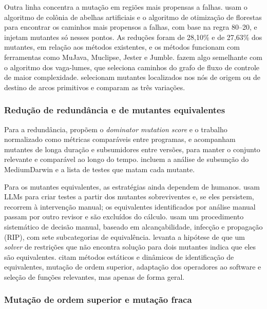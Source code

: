 Outra linha concentra a mutação em regiões mais propensas a falhas.  usam o algoritmo de colônia de abelhas artificiais e  o algoritmo de otimização de florestas para encontrar os caminhos mais propensos a falhas, com base na regra 80--20, e injetam mutantes só nesses pontos. As reduções foram de 28,10\% e de 27,63\% dos mutantes, em relação aos métodos existentes, e os métodos funcionam com ferramentas como MuJava, Muclipse, Jester e Jumble.  fazem algo semelhante com o algoritmo dos vaga-lumes, que seleciona caminhos do grafo de fluxo de controle de maior complexidade.  selecionam mutantes localizados nos nós de origem ou de destino de arcos primitivos e comparam as três variações.

\subsubsection{Redução de redundância e de mutantes equivalentes}
\label{subsubsec:reducao-redundancia}

Para a redundância,  propõem o \textit{dominator mutation score} e o trabalho normalizado como métricas comparáveis entre programas, e  acompanham mutantes de longa duração e subsumidores entre versões, para manter o conjunto relevante e comparável ao longo do tempo.  incluem a análise de subsunção do MediumDarwin e a lista de testes que matam cada mutante.

Para os mutantes equivalentes, as estratégias ainda dependem de humanos.  usam LLMs para criar testes a partir dos mutantes sobreviventes e, se eles persistem, recorrem à intervenção manual; os equivalentes identificados por análise manual passam por outro revisor e são excluídos do cálculo.  usam um procedimento sistemático de decisão manual, baseado em alcançabilidade, infecção e propagação (RIP), com sete subcategorias de equivalência.  levanta a hipótese de que um \textit{solver} de restrições que não encontra solução para dois mutantes indica que eles são equivalentes.  citam métodos estáticos e dinâmicos de identificação de equivalentes, mutação de ordem superior, adaptação dos operadores ao software e seleção de funções relevantes, mas apenas de forma geral.

\subsubsection{Mutação de ordem superior e mutação fraca}
\label{subsubsec:ordem-superior-fraca}

